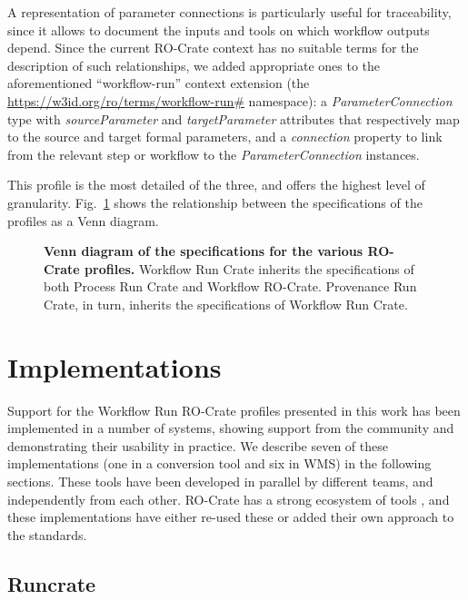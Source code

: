\documentclass[10pt,letterpaper]{article}
\begin{document}
A representation of parameter connections is particularly useful for traceability, since it allows to document the inputs and tools on which workflow outputs depend.
Since the current RO-Crate context has no suitable terms for the description of such relationships, 
we added appropriate ones to the aforementioned  ``workflow-run'' context extension (the \url{https://w3id.org/ro/terms/workflow-run\#} namespace):
a \emph{ParameterConnection} type with
\emph{sourceParameter} and \emph{targetParameter} attributes that respectively map to the source and target formal parameters, and a
\emph{connection} property to link from the relevant step or workflow to the \emph{ParameterConnection} instances.

This profile is the most detailed of the three, and offers the highest level of granularity. Fig.~\ref{fig:profile_venn} shows the relationship between the specifications of the profiles as a Venn diagram.

\begin{figure}[!h]
  \caption{{\bf Venn diagram of the specifications for the various RO-Crate profiles.}
  Workflow Run Crate inherits the specifications of both Process Run Crate and Workflow RO-Crate. Provenance Run Crate, in turn, inherits the specifications of Workflow Run Crate.}
  \label{fig:profile_venn}
  \end{figure}


\section{Implementations}\label{implementations}

Support for the Workflow Run RO-Crate profiles presented in this work has been implemented in a number of systems, showing support from the community and demonstrating their usability in practice.
We describe seven of these implementations (one in a conversion tool and six in WMS) in the following sections.
These tools have been developed in parallel by different teams, and independently from each other. 
RO-Crate has a strong ecosystem of tools \cite{Soiland-Reyes 2022a}, and these implementations have either re-used these or added their own approach to the standards.


\subsection{Runcrate}\label{runcrate}
\end{document}

